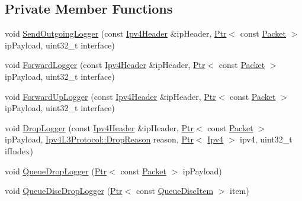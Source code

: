 \subsection*{Private Member Functions}
\begin{DoxyCompactItemize}
\item 
void \hyperlink{classns3_1_1Ipv4FlowProbe_a4f4e830695f0b15a22bb997ff25409ed}{Send\+Outgoing\+Logger} (const \hyperlink{classns3_1_1Ipv4Header}{Ipv4\+Header} \&ip\+Header, \hyperlink{classns3_1_1Ptr}{Ptr}$<$ const \hyperlink{classns3_1_1Packet}{Packet} $>$ ip\+Payload, uint32\+\_\+t interface)
\item 
void \hyperlink{classns3_1_1Ipv4FlowProbe_ad685ed3b3a256105f039723eef98739b}{Forward\+Logger} (const \hyperlink{classns3_1_1Ipv4Header}{Ipv4\+Header} \&ip\+Header, \hyperlink{classns3_1_1Ptr}{Ptr}$<$ const \hyperlink{classns3_1_1Packet}{Packet} $>$ ip\+Payload, uint32\+\_\+t interface)
\item 
void \hyperlink{classns3_1_1Ipv4FlowProbe_a81ca7d15147dd7ac7b0502f37a95972e}{Forward\+Up\+Logger} (const \hyperlink{classns3_1_1Ipv4Header}{Ipv4\+Header} \&ip\+Header, \hyperlink{classns3_1_1Ptr}{Ptr}$<$ const \hyperlink{classns3_1_1Packet}{Packet} $>$ ip\+Payload, uint32\+\_\+t interface)
\item 
void \hyperlink{classns3_1_1Ipv4FlowProbe_a6991c31e2d96a773acb0dcf5ed5161f8}{Drop\+Logger} (const \hyperlink{classns3_1_1Ipv4Header}{Ipv4\+Header} \&ip\+Header, \hyperlink{classns3_1_1Ptr}{Ptr}$<$ const \hyperlink{classns3_1_1Packet}{Packet} $>$ ip\+Payload, \hyperlink{classns3_1_1Ipv4L3Protocol_a05e7403d60c79529257c4cffdd994da1}{Ipv4\+L3\+Protocol\+::\+Drop\+Reason} reason, \hyperlink{classns3_1_1Ptr}{Ptr}$<$ \hyperlink{classns3_1_1Ipv4}{Ipv4} $>$ ipv4, uint32\+\_\+t if\+Index)
\item 
void \hyperlink{classns3_1_1Ipv4FlowProbe_a6a7e09445323c3e491d3ce212f7f55dd}{Queue\+Drop\+Logger} (\hyperlink{classns3_1_1Ptr}{Ptr}$<$ const \hyperlink{classns3_1_1Packet}{Packet} $>$ ip\+Payload)
\item 
void \hyperlink{classns3_1_1Ipv4FlowProbe_ac4fc1a210a1d0540d18caf3dec10a50e}{Queue\+Disc\+Drop\+Logger} (\hyperlink{classns3_1_1Ptr}{Ptr}$<$ const \hyperlink{classns3_1_1QueueDiscItem}{Queue\+Disc\+Item} $>$ item)
\end{DoxyCompactItemize}
